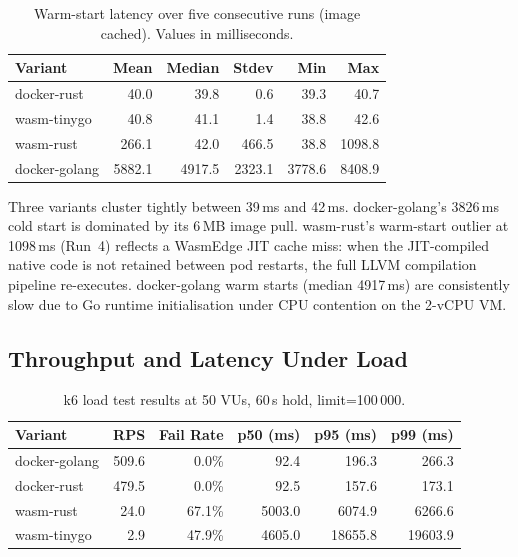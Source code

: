 \begin{table}[htbp]
    \centering
    \caption{Warm-start latency over five consecutive runs (image cached). Values in milliseconds.}
    \label{tab:app_warm_start}
    \begin{tabular}{lrrrrr}
        \hline
        \textbf{Variant} & \textbf{Mean} & \textbf{Median} & \textbf{Stdev} & \textbf{Min} & \textbf{Max} \\
        \hline
        docker-rust   &   40.0 &   39.8 &    0.6 &   39.3 &    40.7 \\
        wasm-tinygo   &   40.8 &   41.1 &    1.4 &   38.8 &    42.6 \\
        wasm-rust     &  266.1 &   42.0 &  466.5 &   38.8 &  1098.8 \\
        docker-golang & 5882.1 & 4917.5 & 2323.1 & 3778.6 &  8408.9 \\
        \hline
    \end{tabular}
\end{table}

Three variants cluster tightly between 39\,ms and 42\,ms. docker-golang's 3826\,ms cold start is dominated by its 6\,MB image pull. wasm-rust's warm-start outlier at 1098\,ms (Run~4) reflects a \acs{WasmEdge} \acs{JIT} cache miss: when the \acs{JIT}-compiled native code is not retained between pod restarts, the full \acs{LLVM} compilation pipeline re-executes. docker-golang warm starts (median 4917\,ms) are consistently slow due to Go runtime initialisation under \acs{CPU} contention on the 2-vCPU \acs{VM}.

\subsection{Throughput and Latency Under Load}

\begin{table}[htbp]
    \centering
    \caption{k6 load test results at 50 VUs, 60\,s hold, limit=100\,000.}
    \label{tab:app_k6_results}
    \begin{tabular}{lrrrrr}
        \hline
        \textbf{Variant} & \textbf{RPS} & \textbf{Fail Rate} & \textbf{p50 (ms)} & \textbf{p95 (ms)} & \textbf{p99 (ms)} \\
        \hline
        docker-golang &  509.6 &  0.0\% &   92.4 &   196.3 &   266.3 \\
        docker-rust   &  479.5 &  0.0\% &   92.5 &   157.6 &   173.1 \\
        wasm-rust     &   24.0 & 67.1\% & 5003.0 &  6074.9 &  6266.6 \\
        wasm-tinygo   &    2.9 & 47.9\% & 4605.0 & 18655.8 & 19603.9 \\
        \hline
    \end{tabular}
\end{table}

